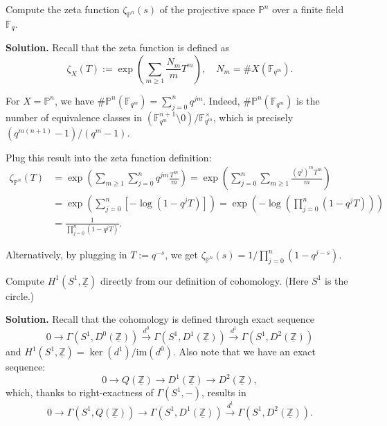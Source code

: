 \documentclass{template}
\begin{document}
\begin{problem}[Exercise 2]
    Compute the zeta function $\zeta_{\mathbb{P}^n}(s)$ of the projective space $\mathbb{P}^n$ over a finite field $\mathbb{F}_q$.
\end{problem}

\textbf{Solution.} Recall that the zeta function is defined as
\begin{equation*}
    \zeta_X(T) := \exp\left(\sum_{m \geq 1} \frac{N_m}{m}T^m\right), \quad N_m = \#X(\mathbb{F}_{q^m}).
\end{equation*}

For $X=\mathbb{P}^n$, we have $\#\mathbb{P}^n(\mathbb{F}_{q^m}) = \sum_{j=0}^n q^{jm}$.
Indeed, $\#\mathbb{P}^n(\mathbb{F}_{q^m})$ is the number of equivalence classes in $(\mathbb{F}_{q^m}^{n+1} \setminus 0) / \mathbb{F}_{q^m}^{\times}$,
which is precisely $(q^{m(n+1)}-1)/(q^m-1)$. 

Plug this result into the zeta function definition:
\begin{align*}
    \zeta_{\mathbb{P}^n}(T) &= \exp\left(\sum_{m \geq 1}\sum_{j=0}^n q^{jm}\frac{T^m}{m} \right) = \exp\left(\sum_{j=0}^n\sum_{m \geq 1} \frac{(q^j)^mT^m}{m} \right) \\
    &= \exp\left(\sum_{j=0}^n\left[-\log(1-q^jT)\right]\right) = \exp\left(-\log\left(\prod_{j=0}^n(1-q^jT)\right)\right) \\
    &= \frac{1}{\prod_{j=0}^n (1-q^jT)}.
\end{align*}

Alternatively, by plugging in $T:=q^{-s}$, we get $\zeta_{\mathbb{P}^n}(s) = 1/\prod_{j=0}^n (1-q^{j-s})$.

\begin{problem}[Exercise 3]
    Compute $H^1(S^1,\underline{\mathbb{Z}})$ directly from our definition of cohomology. (Here $S^1$ is the circle.)
\end{problem}

\textbf{Solution.} Recall that the cohomology is defined through exact sequence
\begin{equation*}
    0 \to \Gamma(S^1, D^0(\underline{\mathbb{Z}})) \xrightarrow{d^0} \Gamma(S^1, D^1(\underline{\mathbb{Z}})) \xrightarrow{d^1} \Gamma(S^1, D^2(\underline{\mathbb{Z}}))
\end{equation*}
and $H^1(S^1,\underline{\mathbb{Z}}) = \ker(d^1) / \text{im}(d^0)$. Also note that we have an exact sequence:
\begin{equation*}
    0 \to Q(\underline{\mathbb{Z}}) \to D^1(\underline{\mathbb{Z}}) \to D^2(\underline{\mathbb{Z}}),
\end{equation*}
which, thanks to right-exactness of $\Gamma(S^1, -)$, results in 
\begin{equation*}
    0 \to \Gamma(S^1, Q(\underline{\mathbb{Z}})) \to \Gamma(S^1, D^1(\underline{\mathbb{Z}})) \xrightarrow{d^1} \Gamma(S^1, D^2(\underline{\mathbb{Z}})).
\end{equation*}
\end{document}

